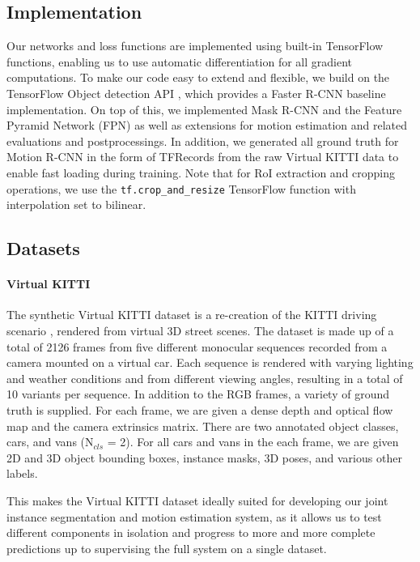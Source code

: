 \subsection{Implementation}
Our networks and loss functions are implemented using built-in TensorFlow \cite{TensorFlow}
functions, enabling us to use automatic differentiation for all gradient
computations. To make our code easy to extend and flexible, we build on
the TensorFlow Object detection API \cite{TensorFlowObjectDetection}, which provides a Faster R-CNN baseline
implementation.
On top of this, we implemented Mask R-CNN and the Feature Pyramid Network (FPN)
as well as extensions for motion estimation and related evaluations
and postprocessings. In addition, we generated all ground truth for
Motion R-CNN in the form of TFRecords from the raw Virtual KITTI
data to enable fast loading during training.
Note that for RoI extraction and cropping operations,
we use the \texttt{tf.crop\_and\_resize} TensorFlow function with
interpolation set to bilinear.

\subsection{Datasets}
\label{ssec:datasets}

\paragraph{Virtual KITTI}
The synthetic Virtual KITTI dataset \cite{VKITTI} is a re-creation of the KITTI
driving scenario \cite{KITTI2012, KITTI2015}, rendered from virtual 3D street
scenes.
The dataset is made up of a total of 2126 frames from five different monocular
sequences recorded from a camera mounted on a virtual car.
Each sequence is rendered with varying lighting and weather conditions and
from different viewing angles, resulting in a total of 10 variants per sequence.
In addition to the RGB frames, a variety of ground truth is supplied.
For each frame, we are given a dense depth and optical flow map and the camera
extrinsics matrix. There are two annotated object classes, cars, and vans (N$_{cls}$ = 2).
For all cars and vans in the each frame, we are given 2D and 3D object bounding
boxes, instance masks, 3D poses, and various other labels.

This makes the Virtual KITTI dataset ideally suited for developing our joint
instance segmentation and motion estimation system, as it allows us to test
different components in isolation and progress to more and more complete
predictions up to supervising the full system on a single dataset.

